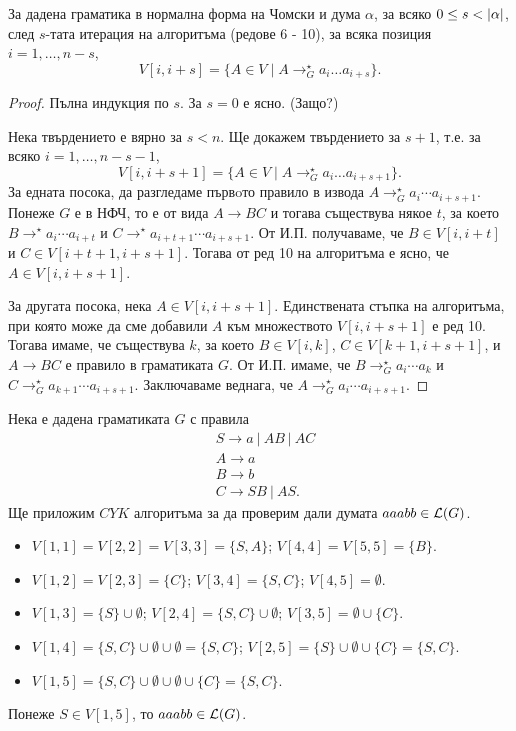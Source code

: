 \begin{lemma}
  За дадена граматика в нормална форма на Чомски и дума $\alpha$, 
  за всяко $0 \leq s < \lvert{\alpha}\rvert$, след $s$-тата итерация на алгоритъма (редове 6 - 10), за всяка позиция $i = 1,\dots,n-s$,
  \[V[i,i+s] = \{A \in V \mid A \rightarrow^\star_G a_i\dots a_{i+s}\}.\]
\end{lemma}
\begin{proof}
  Пълна индукция по $s$.
  За $s = 0$  е ясно. (Защо?)

  Нека твърдението е вярно за $s < n$. Ще докажем твърдението за $s+1$, т.е. за всяко $i = 1,\dots,n-s-1$,
  \[V[i,i+s+1] = \{A \in V \mid A \rightarrow^\star_G a_i\dots a_{i+s+1}\}.\]
  За едната посока, да разгледаме първoто правило в извода $A \to^\star_G a_i\cdots a_{i+s+1}$.
  Понеже $G$ е в НФЧ, то е от вида $A \to BC$ и тогава съществува някое $t$, за което 
  $B \to^\star a_i\cdots a_{i+t}$ и $C \to^\star a_{i+t+1}\cdots a_{i+s+1}$.
  От И.П. получаваме, че $B \in V[i,i+t]$ и $C \in V[i+t+1,i+s+1]$.
  Тогава от ред 10 на алгоритъма е ясно, че $A \in V[i,i+s+1]$.
  
  За другата посока, нека $A \in V[i,i+s+1]$.
  Единствената стъпка на алгоритъма, при която може да сме добавили $A$ към множеството $V[i,i+s+1]$ е ред 10.
  Тогава имаме, че съществува $k$, за което $B \in V[i,k]$, $C \in V[k+1,i+s+1]$, и $A\to BC$ е правило в граматиката $G$.
  От И.П. имаме, че $B \to^\star_G a_i\cdots a_k$ и $C \to^\star_G a_{k+1}\cdots a_{i+s+1}$.
  Заключаваме веднага, че $A \to^\star_G a_i\cdots a_{i+s+1}$.
\end{proof}

\begin{example}
  Нека е дадена граматиката $G$ с правила 
  \begin{align*}
    & S\rightarrow a\ |\ AB\ |\ AC\\
    & A\rightarrow a\\
    & B\rightarrow b\\
    & C\rightarrow SB\ |\ AS.
  \end{align*}
  Ще приложим $CYK$ алгоритъма за да проверим дали думата $aaabb \in \mathcal{L}(G)$.
  \begin{itemize}
  \item 
    $V[1,1] = V[2,2] = V[3,3] = \{S,A\}$;
    $V[4,4] = V[5,5] = \{B\}$.
  \item
    $V[1,2] = V[2,3] = \{C\}$;
    $V[3,4] = \{S,C\}$;
    $V[4,5] = \emptyset$.
  \item
    $V[1,3] = \{S\} \cup \emptyset$;
    $V[2,4] = \{S,C\} \cup \emptyset$;
    $V[3,5] = \emptyset \cup \{C\}$.
  \item
    $V[1,4] = \{S,C\} \cup \emptyset \cup \emptyset = \{S,C\}$;
    $V[2,5] = \{S\} \cup \emptyset \cup \{C\} = \{S,C\}$.
  \item
    $V[1,5] = \{S,C\} \cup \emptyset \cup \emptyset \cup \{C\}= \{S,C\}$.
  \end{itemize}
  Понеже $S \in V[1,5]$, то $aaabb \in \mathcal{L}(G)$.
\end{example}

